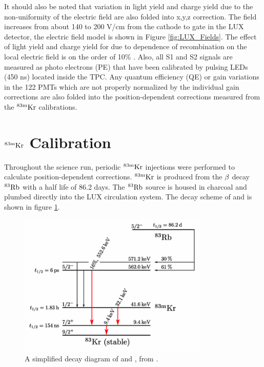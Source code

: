 It should also be noted that variation in light yield and charge yield due to the non-uniformity of the electric field are also folded into x,y,z correction.  The field increases from about 140 to 200 V/cm from the cathode to gate in the LUX detector, the electric field model is shown in Figure \ref{fig:LUX_Fields}. The effect of light yield and charge yield for \KrCal due to dependence of recombination on the local electric field is on the order of 10\% \cite{NEST_2013}. Also, all S1 and S2 signals are measured as photo electrons (PE) that have been calibrated by pulsing LEDs (450 ns) located inside the TPC. Any quantum efficiency (QE) or gain variations in the 122 PMTs which are not properly normalized by the individual gain corrections are also folded into the position-dependent corrections measured from the $\rm^{83m}Kr$ calibrations.


\section{$\rm^{83m}Kr$ Calibration}

Throughout the science run, periodic $\rm^{83m}Kr$ injections were performed to calculate position-dependent corrections. $\rm ^{83m}Kr$ is produced from the $\rm \beta$ decay $\rm^{83}Rb$ with a half life of 86.2 days. The $\rm^{83}Rb$ source is housed in charcoal and plumbed directly into the LUX circulation system. The decay scheme of \Rb and \KrCal is shown in figure \ref{fig:Kr_Decay}.

\begin{figure}[h!]\centering
\includegraphics[width=90mm]{Chapter_XYZ_Corr/Thesis_Corr_Plots/RbKr_83_Decay.png}
\caption{A simplified decay diagram of \Rb and \KrCal, from \cite{Kr_Decay_Diagram}.}
\label{fig:Kr_Decay}
\end{figure}

